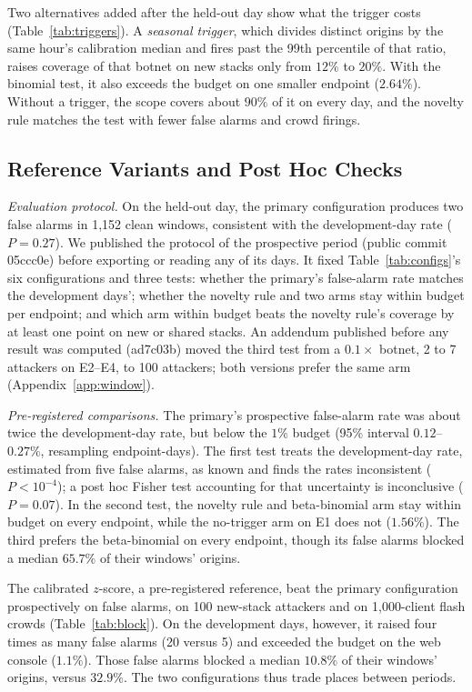 \documentclass[conference,letterpaper,10pt]{IEEEtran}
\newcommand\1{\textit{(i)}}
\newcommand\2{\textit{(ii)}}
\newcommand\3{\textit{(iii)}}
\newcommand\4{\textit{(iv)}}
\newcommand\5{\textit{(v)}}
\newcommand\6{\textit{(vi)}}
\newcommand\7{\textit{(vii)}}
\newcommand\8{\textit{(viii)}}
\newcommand\9{\textit{(ix)}}
\begin{document}
Two alternatives added after the held-out day show what the trigger costs (Table~\ref{tab:triggers}). A \textit{seasonal trigger}, which divides distinct origins by the same hour's calibration median and fires past the 99th percentile of that ratio, raises coverage of that botnet on new stacks only from $12\%$ to $20\%$. With the binomial test, it also exceeds the budget on one smaller endpoint ($2.64\%$). Without a trigger, the scope covers about $90\%$ of it on every day, and the novelty rule matches the test with fewer false alarms and crowd firings.

\subsection{Reference Variants and Post Hoc Checks}
\label{sec:posthoc}
\label{sec:boundary}


\textit{Evaluation protocol.} On the held-out day, the primary configuration produces two false alarms in 1,152 clean windows, consistent with the development-day rate ($P = 0.27$). We published the protocol of the prospective period (public commit 05ccc0e) before exporting or reading any of its days. It fixed Table~\ref{tab:configs}'s six configurations and three tests: whether the primary's false-alarm rate matches the development days'; whether the novelty rule and two arms stay within budget per endpoint; and which arm within budget beats the novelty rule's coverage by at least one point on new or shared stacks. An addendum published before any result was computed (ad7c03b) moved the third test from a $0.1\times$ botnet, 2 to 7 attackers on E2--E4, to 100 attackers; both versions prefer the same arm (Appendix~\ref{app:window}).

\textit{Pre-registered comparisons.} The primary's prospective false-alarm rate was about twice the development-day rate, but below the $1\%$ budget (95\% interval $0.12$--$0.27\%$, resampling endpoint-days). The first test treats the development-day rate, estimated from five false alarms, as known and finds the rates inconsistent ($P<10^{-4}$); a post hoc Fisher test accounting for that uncertainty is inconclusive ($P=0.07$). In the second test, the novelty rule and beta-binomial arm stay within budget on every endpoint, while the no-trigger arm on E1 does not ($1.56\%$). The third prefers the beta-binomial on every endpoint, though its false alarms blocked a median $65.7\%$ of their windows' origins.

The calibrated $z$-score, a pre-registered reference, beat the primary configuration prospectively on false alarms, on 100 new-stack attackers and on 1,000-client flash crowds (Table~\ref{tab:block}). On the development days, however, it raised four times as many false alarms (20 versus 5) and exceeded the budget on the web console ($1.1\%$). Those false alarms blocked a median $10.8\%$ of their windows' origins, versus $32.9\%$. The two configurations thus trade places between periods.
\end{document}

